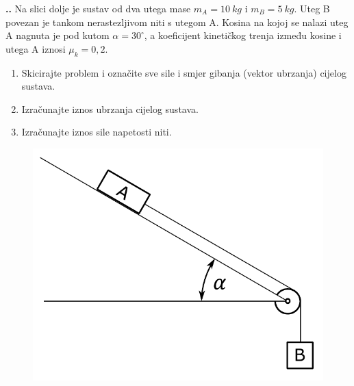 

\noindent 
\textbf{
\thecjelina.\thezadatak.}
Na slici dolje je sustav od dva utega mase $m_A=10\ kg$ i $m_B=5\ kg$. Uteg B povezan je tankom nerastezljivom niti s utegom A. 
Kosina na kojoj se nalazi uteg A nagnuta je pod kutom $\alpha=30^\circ$, a koeficijent kinetičkog trenja između kosine i utega A iznosi $\mu_k=0,2$.
\begin{enumerate}[label=\alph*)]
 \item Skicirajte problem i označite sve sile i smjer gibanja (vektor ubrzanja) cijelog sustava.
 \item Izračunajte iznos ubrzanja cijelog sustava.
 \item Izračunajte iznos sile napetosti niti.
\end{enumerate}
\begin{figure}[ht]%
  \begin{center}
    \includegraphics[scale=0.40]{03_Dinamika_materijalne_tocke/kosina_5_2.png}
  \end{center}
\end{figure}
